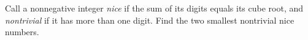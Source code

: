 Call a nonnegative integer \emph{nice} if the sum of its digits equals its cube root, and \emph{nontrivial} if it has more than one digit. Find the two smallest nontrivial nice numbers.
